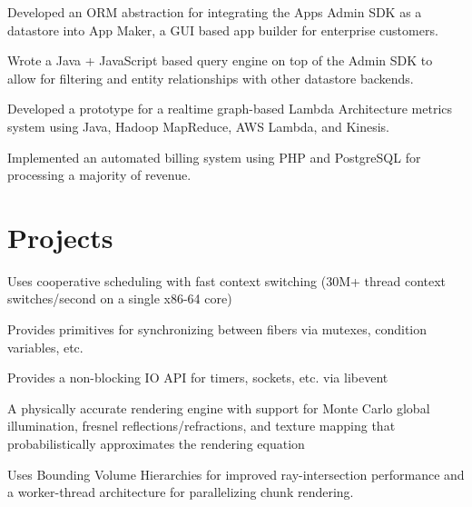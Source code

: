 \documentclass[]{resume}
\begin{document}
\begin{minipage}[t]{0.66\textwidth}
\begin{tightemize}
\item Developed an ORM abstraction for integrating the Apps Admin SDK as a datastore into App Maker, a GUI based app builder for enterprise customers.
\item Wrote a Java + JavaScript based query engine on top of the Admin SDK to allow for filtering and entity relationships with other datastore backends.
\end{tightemize}
\sectionsep

\begin{tightemize}
\item Developed a prototype for a realtime graph-based Lambda Architecture metrics system using Java, Hadoop MapReduce, AWS Lambda, and Kinesis.
\item Implemented an automated billing system using PHP and PostgreSQL for processing a majority of revenue.
\end{tightemize}
\sectionsep


\section{Projects}

\begin{tightemize}
\item Uses cooperative scheduling with fast context switching (30M+ thread context switches/second on a single x86-64 core)
\item Provides primitives for synchronizing between fibers via mutexes, condition variables, etc.
\item Provides a non-blocking IO API for timers, sockets, etc. via libevent
\end{tightemize}
\sectionsep

\begin{tightemize}
\item A physically accurate rendering engine with support for Monte Carlo global illumination, fresnel reflections/refractions, and texture mapping that probabilistically approximates the rendering equation
\item Uses Bounding Volume Hierarchies for improved ray-intersection performance and a worker-thread architecture for parallelizing chunk rendering.
\end{tightemize}
\sectionsep

\end{minipage}
\end{document}
